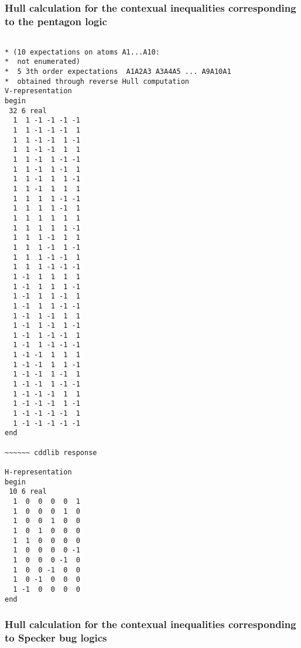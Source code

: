 \documentclass[%
  twocolumn,
 showpacs,
 showkeys,
 preprintnumbers,
 amsmath,amssymb,
 aps,
  pra,
  longbibliography,
 floatfix,
 ]{revtex4-1}
\begin{document}
\subsubsection{Hull calculation for the contexual inequalities corresponding to the pentagon logic}

{ \begin{lstlisting}[backgroundcolor=\color{yellow!10},framerule=0pt,breaklines=true, frame=tb]

* (10 expectations on atoms A1...A10:
*  not enumerated)
*  5 3th order expectations  A1A2A3 A3A4A5 ... A9A10A1
*  obtained through reverse Hull computation
V-representation
begin
 32 6 real
  1  1 -1 -1 -1 -1
  1  1 -1 -1 -1  1
  1  1 -1 -1  1 -1
  1  1 -1 -1  1  1
  1  1 -1  1 -1 -1
  1  1 -1  1 -1  1
  1  1 -1  1  1 -1
  1  1 -1  1  1  1
  1  1  1  1 -1 -1
  1  1  1  1 -1  1
  1  1  1  1  1  1
  1  1  1  1  1 -1
  1  1  1 -1  1  1
  1  1  1 -1  1 -1
  1  1  1 -1 -1  1
  1  1  1 -1 -1 -1
  1 -1  1  1  1  1
  1 -1  1  1  1 -1
  1 -1  1  1 -1  1
  1 -1  1  1 -1 -1
  1 -1  1 -1  1  1
  1 -1  1 -1  1 -1
  1 -1  1 -1 -1  1
  1 -1  1 -1 -1 -1
  1 -1 -1  1  1  1
  1 -1 -1  1  1 -1
  1 -1 -1  1 -1  1
  1 -1 -1  1 -1 -1
  1 -1 -1 -1  1  1
  1 -1 -1 -1  1 -1
  1 -1 -1 -1 -1  1
  1 -1 -1 -1 -1 -1
end

~~~~~~ cddlib response

H-representation
begin
 10 6 real
  1  0  0  0  0  1
  1  0  0  0  1  0
  1  0  0  1  0  0
  1  0  1  0  0  0
  1  1  0  0  0  0
  1  0  0  0  0 -1
  1  0  0  0 -1  0
  1  0  0 -1  0  0
  1  0 -1  0  0  0
  1 -1  0  0  0  0
end

\end{lstlisting}  }

\subsubsection{Hull calculation for the contexual inequalities corresponding to Specker bug logics}
\end{document}
